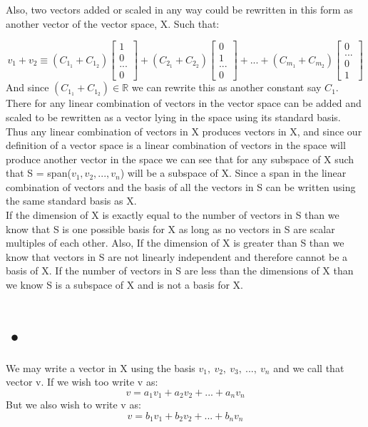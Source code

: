 \documentclass[12pt]{article}
\begin{document}
Also, two vectors added or scaled in any way could be rewritten in this form as another vector of the vector space, X. Such that:


\[
v_1 + v_2 \equiv
(C_{1_1} + C_{1_2} )
\begin{bmatrix}
1\\
0\\
...\\
0
\end{bmatrix}
+ (C_{2_1} + C_{2_2} )
\begin{bmatrix}
0\\
1\\
...\\
0
\end{bmatrix}
+ ...
+ (C_{m_1} + C_{m_2} )
\begin{bmatrix}
0\\
...\\
0\\
1
\end{bmatrix}
\]
And since $(C_{1_1} + C_{1_2} ) \in \mathbb{R}$ we can rewrite this as another constant say $C_1$. There for any linear combination of vectors in the vector space can be added and scaled to be rewritten as a vector lying in the space using its standard basis. Thus any linear combination of vectors in X produces vectors in X, and since our definition of a vector space is a linear combination of vectors in the space will produce another vector in the space we can see that for any subspace of X such that S = span($v_1, v_2, ..., v_n$) will be a subspace of X. Since a span in the linear combination of vectors and the basis of all the vectors in S can be written using the same standard basis as X.\\

If the dimension of X is exactly equal to the number of vectors in S than we know that S is one possible basis for X as long as no vectors in S are scalar multiples of each other. Also, If the dimension of X is greater than S than we know that vectors in S are not linearly independent and therefore cannot be a basis of X. If the number of vectors in S are less than the dimensions of X than we know S is a subspace of X and is not a basis for X.

\section{•}

We may write a vector in X using the basis $v_1,\ v_2 ,\ v_3,\ ...,\ v_n$ and we call that vector v. If we wish too write v as:
$$ v = a_1 v_1 + a_2 v_2 + ... + a_n v_n  $$
But we also wish to write v as:
$$ v = b_1 v_1 + b_2 v_2 + ... + b_n v_n $$
\end{document}
